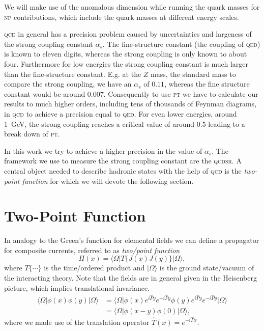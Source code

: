 \documentclass[../../index.tex]{subfiles}
\begin{document}
We will make use of the anomalous dimension while running the quark masses for
\textsc{np} contributions, which include the quark masses at different energy
scales.

\textsc{qcd} in general has a precision problem caused by uncertainties and
largeness of the strong coupling constant \(\alpha_s\). The fine-structure
constant (the coupling of \textsc{qed}) is known to eleven digits, whereas the
strong coupling is only known to about four. Furthermore for low energies the
strong coupling constant is much larger than the fine-structure constant. E.g.
at the \(Z\) mass, the standard mass to compare the strong coupling, we have an
\(\alpha_s\) of \(0.11\), whereas the fine structure constant would be around
\(0.007\). Consequently to use \textsc{pt} we have to calculate our results to
much higher orders, including tens of thousands of Feynman diagrams, in
\textsc{qcd} to achieve a precision equal to \textsc{qed}. For even lower
energies, around \SI{1}{\giga\eV}, the strong coupling reaches a critical value
of around \(0.5\) leading to a break down of \textsc{pt}.

In this work we try to achieve a higher precision in the value of \(\alpha_s\).
The framework we use to measure the strong coupling constant are the
\textsc{qcdsr}. A central object needed to describe hadronic states with the
help of \textsc{qcd} is the \textit{two-point function} for which we will devote
the following section.

\section{Two-Point Function}
\label{sec:twoPointFunction}
In analogy to the Green's function for elemental fields we can define a
propagator for composite currents, referred to as \textit{two\-/point function}
\begin{equation}
  \Pi(x) = \langle\Omega\vert T\{J(x)J(y)\} \vert\Omega\rangle,
\end{equation}
where \(T\{\cdots\}\) is the time\-/ordered product and \(\vert\Omega\rangle\)
is the ground state/vacuum of the interacting theory. Note that the fields are
in general given in the Heisenberg picture, which implies translational
invariance.
\begin{equation}
  \begin{split}
    \langle\Omega\vert \phi(x)\phi(y) \vert\Omega\rangle &= \langle\Omega\vert \phi(x) e^{i\hat P y}e^{-i\hat P y}\phi(y)e^{i\hat P y}e^{-i\hat P y} \vert\Omega\rangle \\
    &= \langle\Omega\vert \phi(x-y)\phi(0) \vert\Omega\rangle,
  \end{split}
\end{equation}
where we made use of the translation operator \(\hat T(x) = e^{-i \hat P x}\).
\end{document}
